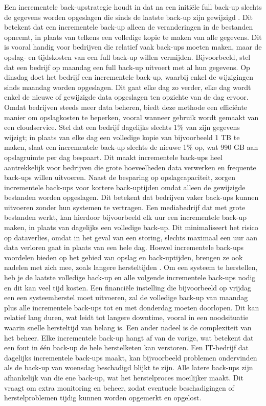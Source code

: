 Een incrementele back-upstrategie houdt in dat na een initiële full back-up slechts de gegevens worden opgeslagen die sinds de laatste back-up zijn gewijzigd \autocite{Zhao2024}. Dit betekent dat een incrementele back-up alleen de veranderingen in de bestanden opneemt, in plaats van telkens een volledige kopie te maken van alle gegevens. Dit is vooral handig voor bedrijven die relatief vaak back-ups moeten maken, maar de opslag- en tijdskosten van een full back-up willen vermijden. Bijvoorbeeld, stel dat een bedrijf op maandag een full back-up uitvoert met al hun gegevens. Op dinsdag doet het bedrijf een incrementele back-up, waarbij enkel de wijzigingen sinds maandag worden opgeslagen. Dit gaat elke dag zo verder, elke dag wordt enkel de nieuwe of gewijzigde data opgeslagen ten opzichte van de dag ervoor. Omdat bedrijven steeds meer data beheren, biedt deze methode een efficiënte manier om opslagkosten te beperken, vooral wanneer gebruik wordt gemaakt van een cloudservice. Stel dat een bedrijf dagelijks slechts 1\% van zijn gegevens wijzigt; in plaats van elke dag een volledige kopie van bijvoorbeeld 1 TB te maken, slaat een incrementele back-up slechts de nieuwe 1\% op, wat 990 GB aan opslagruimte per dag bespaart. Dit maakt incrementele back-ups heel aantrekkelijk voor bedrijven die grote hoeveelheden data verwerken en frequente back-ups willen uitvoeren. Naast de besparing op opslagcapaciteit, zorgen incrementele back-ups voor kortere back-uptijden omdat alleen de gewijzigde bestanden worden opgeslagen. Dit betekent dat bedrijven vaker back-ups kunnen uitvoeren zonder hun systemen te vertragen. Een mediabedrijf dat met grote bestanden werkt, kan hierdoor bijvoorbeeld elk uur een incrementele back-up maken, in plaats van dagelijks een volledige back-up. Dit minimaliseert het risico op dataverlies, omdat in het geval van een storing, slechts maximaal een uur aan data verloren gaat in plaats van een hele dag. Hoewel incrementele back-ups voordelen bieden op het gebied van opslag en back-uptijden, brengen ze ook nadelen met zich mee, zoals langere hersteltijden \autocite{Chervenak1998}. Om een systeem te herstellen, heb je de laatste volledige back-up en alle volgende incrementele back-ups nodig en dit kan veel tijd kosten. Een financiële instelling die bijvoorbeeld op vrijdag een een systeemherstel moet uitvoeren, zal de volledige back-up van maandag plus alle incrementele back-ups tot en met donderdag moeten doorlopen. Dit kan relatief lang duren, wat leidt tot langere downtime, vooral in een noodsituatie waarin snelle hersteltijd van belang is. Een ander nadeel is de complexiteit van het beheer. Elke incrementele back-up hangt af van de vorige, wat betekent dat een fout in één back-up de hele herstelketen kan verstoren. Een IT-bedrijf dat dagelijks incrementele back-ups maakt, kan bijvoorbeeld problemen ondervinden als de back-up van woensdag beschadigd blijkt te zijn. Alle latere back-ups zijn afhankelijk van die ene back-up, wat het herstelproces moeilijker maakt. Dit vraagt om extra monitoring en beheer, zodat eventuele beschadigingen of herstelproblemen tijdig kunnen worden opgemerkt en opgelost.
